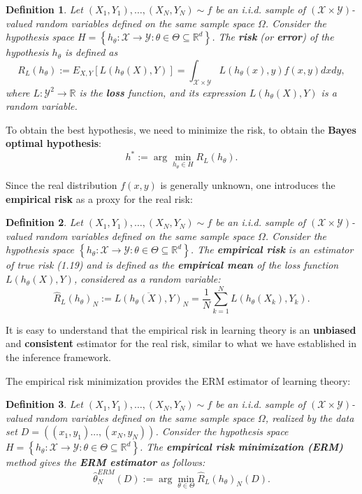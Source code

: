 \documentclass{report}
\newtheorem{definition}{Definition}[chapter]
\begin{document}
 \begin{definition}
Let $(X_1, Y_1),\dots,(X_N, Y_N) \sim f$ be an i.i.d. sample of $(\mathcal{X} \times \mathcal{Y})$-valued random variables defined on the same sample space $\Omega$. Consider the hypothesis space $H = \left\{h_\theta : \mathcal{X} \to \mathcal{Y} :\theta\in\Theta\subseteq\mathbb{R}^d\right\}$. The \textbf{risk} (or \textbf{error}) of the hypothesis $h_\theta$ is defined as
\begin{equation}
R_L(h_\theta) := E_{X,Y}[L(h_\theta(X),Y)] = \int_{\mathcal{X} \times \mathcal{Y}} L(h_\theta(x),y)f(x,y)dxdy,
\end{equation}
where $L :\mathcal{Y}^2 \to \mathbb{R}$ is the \textbf{loss} function, and its expression $L(h_\theta(X), Y)$ is a random variable.  
\end{definition}

To obtain the best hypothesis, we need to minimize the risk, to obtain the \textbf{Bayes optimal hypothesis}: 
\begin{equation}
h^* := \arg \min_{h_\theta \in H} R_L(h_\theta). 
\end{equation}

Since the real distribution $f(x,y)$ is generally unknown, one introduces the \textbf{empirical risk} as a proxy for the real risk:
\begin{definition}
Let $(X_1, Y_1),\dots,(X_N, Y_N) \sim f$ be an i.i.d. sample of $(\mathcal{X} \times \mathcal{Y})$-valued random variables defined on the same sample space $\Omega$. Consider the hypothesis space $\left\{h_\theta : \mathcal{X} \to \mathcal{Y} :\theta\in\Theta\subseteq\mathbb{R}^d\right\}$. The \textbf{empirical risk} is an estimator of true risk (1.19) and is defined as the \textbf{empirical mean} of the loss function $L(h_\theta(X), Y)$, considered as a random variable:
\begin{equation}
\hat{R}_L(h_\theta)_N := \overline{L(h_\theta(X),Y)}_N = \frac{1}{N}\sum_{k=1}^{N}L(h_\theta(X_k),Y_k).
\end{equation}
\end{definition}

It is easy to understand that the empirical risk in learning theory is an \textbf{unbiased} and \textbf{consistent} estimator for the real risk, similar to what we have established in the inference framework.

The empirical risk minimization provides the ERM estimator of learning theory:
\begin{definition}
Let $(X_1, Y_1),\dots,(X_N, Y_N) \sim f$ be an i.i.d. sample of $(\mathcal{X} \times \mathcal{Y})$-valued random variables defined on the same sample space $\Omega$, realized by the data set $D =((x_1, y_1)\dots,(x_N,y_N))$. Consider the hypothesis space $H = \left\{h_\theta : \mathcal{X} \to \mathcal{Y} :\theta\in\Theta\subseteq\mathbb{R}^d\right\}$. The \textbf{empirical risk minimization (ERM)} method gives the \textbf{ERM estimator} as follows:
\begin{equation}
\hat{\theta}^{ERM}_N(D) := \arg\min_{\theta \in \Theta}\hat{R}_L(h_\theta)_N(D).
\end{equation}
\end{definition}
\end{document}
